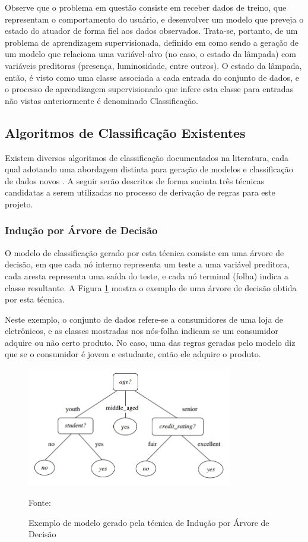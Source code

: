 Observe que o problema em questão consiste em receber dados de treino, que representam o comportamento do usuário, e desenvolver um modelo que preveja o estado do atuador de forma fiel aos dados observados. Trata-se, portanto, de um problema de aprendizagem supervisionada, definido em \cite{james2014} como sendo a geração de um modelo que relaciona uma variável-alvo (no caso, o estado da lâmpada) com variáveis preditoras (presença, luminosidade, entre outros). O estado da lâmpada, então, é visto como uma classe associada a cada entrada do conjunto de dados, e o processo de aprendizagem supervisionado que infere esta classe para entradas não vistas anteriormente é denominado Classificação.

\subsection{Algoritmos de Classificação Existentes}\label{subsec:algclass}
Existem diversos algoritmos de classificação documentados na literatura, cada qual adotando uma abordagem distinta para geração de modelos e classificação de dados novos \cite{han2005, james2014}. A seguir serão descritos de forma sucinta três técnicas candidatas a serem utilizadas no processo de derivação de regras para este projeto.

\subsubsection{Indução por Árvore de Decisão}
O modelo de classificação gerado por esta técnica consiste em uma árvore de decisão, em que cada nó interno representa um teste a uma variável preditora, cada aresta representa uma saída do teste, e cada nó terminal (folha) indica a classe resultante. A Figura \ref{fig:exemplo_arvore} mostra o exemplo de uma árvore de decisão obtida por esta técnica. 

Neste exemplo, o conjunto de dados refere-se a consumidores de uma loja de eletrônicos, e as classes mostradas nos nós-folha indicam se um consumidor adquire ou não certo produto. No caso, uma das regras geradas pelo modelo diz que se o consumidor é jovem e estudante, então ele adquire o produto.

\begin{figure}[h]
	\centering
	\caption{Exemplo de modelo gerado pela técnica de Indução por Árvore de Decisão}
  \includegraphics[width=0.8\textwidth]{imagens/exemplo_arvore.png}
  \label{fig:exemplo_arvore}  
  
  Fonte: \cite{han2005}
\end{figure}

